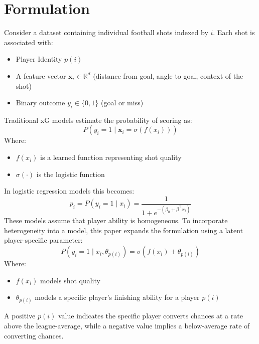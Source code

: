 \documentclass{article}
\begin{document}
\section{Formulation}
Consider a dataset containing individual football shots indexed by $i$. Each shot is associated with:
\begin{itemize}
    \item Player Identity $p(i)$
    \item A feature vector $\mathbf{x}_i \in \mathbb{R}^d$ (distance from goal, angle to goal, context of the shot)
    \item Binary outcome $y_i \in \{0,1\}$ (goal or miss)
\end{itemize}
Traditional xG models estimate the probability of scoring as:
\begin{equation}
    P(y_i = 1 \mid \mathbf{x}_i = \sigma(f({x}_i)))
\end{equation}
Where:
\begin{itemize}
    \item $f({x}_i)$ is a learned function representing shot quality
    \item $\sigma(\cdot)$ is the logistic function
\end{itemize}
In logistic regression models this becomes:
\begin{equation}
    p_i = P(y_i = 1 \mid {x}_i) = \frac{1}{1 + e^{-(\beta_0 + \beta^\top {x}_i)}}
\end{equation}
These models assume that player ability is homogeneous. To incorporate heterogeneity into a model, this paper expands the formulation using a latent player-specific parameter:
\begin{equation}\label{eq4}
    P(y_i = 1 \mid {x}_i, \theta_{p(i)}) = \sigma (f({x}_i) + \theta_{p(i)})
\end{equation}
Where:
\begin{itemize}
    \item $f({x}_i)$ models shot quality
    \item $\theta_{p(i)}$ models a specific player's finishing ability for a player $p(i)$
\end{itemize}
A positive $p(i)$ value indicates the specific player converts chances at a rate above the league-average, while a negative value implies a below-average rate of converting chances.
\end{document}
